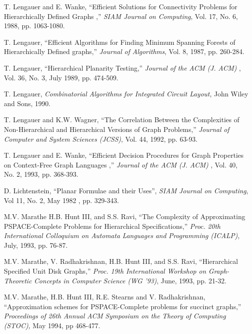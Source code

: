 \begin{thebibliography}{HMRR93}
T. Lengauer and  E. Wanke,
``Efficient Solutions for Connectivity Problems for Hierarchically  
Defined Graphs ,''
{\em SIAM Journal on Computing}, 
Vol. 17, No. 6, 1988, pp. 1063-1080.




T. Lengauer,
``Efficient Algorithms for Finding Minimum Spanning Forests of 
Hierarchically Defined graphs,''
{\em Journal of Algorithms}, Vol. 8, 1987, pp. 260-284.


T. Lengauer,
``Hierarchical Planarity Testing,''
{\em Journal of the ACM (J. ACM) }, 
Vol. 36, No. 3, July 1989, pp. 474-509.


T. Lengauer,
{\em Combinatorial Algorithms for Integrated Circuit Layout,}
John Wiley and Sons, 1990.


T. Lengauer and  K.W. Wagner,
``The Correlation Between the Complexities of Non-Hierarchical and
Hierarchical Versions of Graph Problems,''
{\em Journal of Computer and System Sciences (JCSS)}, 
Vol. 44,  1992, pp. 63-93. 



T. Lengauer and  E. Wanke,
``Efficient Decision Procedures for Graph Properties on Context-Free 
Graph Languages ,''
{\em Journal of the ACM (J. ACM) }, 
Vol. 40, No. 2, 1993, pp. 368-393.



 D. Lichtenstein,
``Planar Formulae and their Uses'', 
{\em SIAM Journal on Computing},
Vol 11, No. 2, May 1982 , pp. 329-343.




 M.V. Marathe H.B. Hunt III,  and S.S. Ravi,
``The Complexity of Approximating PSPACE-Complete Problems for 
Hierarchical Specifications,''
{\em Proc. 20th 
International Colloquium on Automata Languages and Programming (ICALP)}, 
July, 1993, pp. 76-87.


M.V. Marathe, V. Radhakrishnan,  H.B. Hunt III,  and S.S. Ravi,
``Hierarchical Specified Unit Disk Graphs,''
{\em Proc. 19th International 
Workshop on Graph-Theoretic Concepts in Computer Science (WG '93)}, 
June, 1993, pp. 21-32. 




  M.V. Marathe, H.B. Hunt III, 
R.E. Stearns and V. Radhakrishnan,
``Approximation schemes for
PSPACE-Complete problems for succinct graphs,'' 
{\em Proceedings of 26th Annual ACM
Symposium on the Theory of Computing (STOC),} May 1994,
pp 468-477.





\end{thebibliography}

